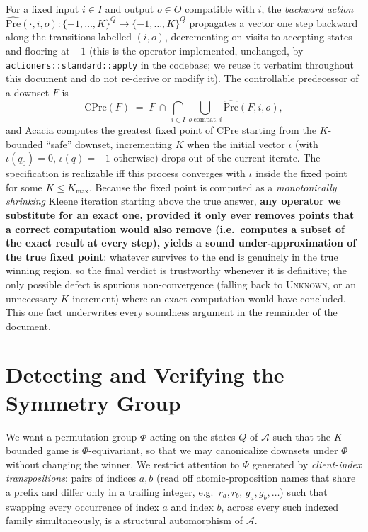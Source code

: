 \documentclass[11pt]{article}
\newcommand{\Aut}{\mathcal{A}}
\newcommand{\Q}{Q}
\newcommand{\Phigroup}{\Phi}
\newcommand{\CPre}{\mathrm{CPre}}
\newcommand{\PreHat}{\widehat{\mathrm{Pre}}}
\begin{document}
For a fixed input $i \in I$ and output $o \in O$ compatible with $i$, the
\emph{backward action} $\PreHat(\cdot, i, o) : \{-1,\dots,K\}^\Q \to
\{-1,\dots,K\}^\Q$ propagates a vector one step backward along the
transitions labelled $(i,o)$, decrementing on visits to accepting states and
flooring at $-1$ (this is the operator implemented, unchanged, by
\texttt{actioners::standard::apply} in the codebase; we reuse it verbatim
throughout this document and do not re-derive or modify it). The
controllable predecessor of a downset $F$ is
\[
  \CPre(F) \;=\; F \,\cap\, \bigcap_{i \in I} \bigcup_{o\ \mathrm{compat.}\ i} \PreHat(F, i, o),
\]
and Acacia computes the greatest fixed point of $\CPre$ starting from the
$K$-bounded ``safe'' downset, incrementing $K$ when the initial vector
$\iota$ (with $\iota(q_0)=0$, $\iota(q)=-1$ otherwise) drops out of the
current iterate. The specification is realizable iff this process converges
with $\iota$ inside the fixed point for some $K \leq K_{\max}$. Because the
fixed point is computed as a \emph{monotonically shrinking} Kleene
iteration starting above the true answer, \textbf{any operator we
substitute for an exact one, provided it only ever removes points that a
correct computation would also remove (i.e.\ computes a subset of the exact
result at every step), yields a sound under-approximation of the true
fixed point}: whatever survives to the end is genuinely in the true winning
region, so the final verdict is trustworthy whenever it is definitive; the
only possible defect is spurious non-convergence (falling back to
\textsc{Unknown}, or an unnecessary $K$-increment) where an exact
computation would have concluded. This one fact underwrites every
soundness argument in the remainder of the document.

\section{Detecting and Verifying the Symmetry Group}
\label{sec:detection}

We want a permutation group $\Phigroup$ acting on the states $\Q$ of $\Aut$
such that the $K$-bounded game is $\Phigroup$-equivariant, so that we may
canonicalize downsets under $\Phigroup$ without changing the winner. We
restrict attention to $\Phigroup$ generated by \emph{client-index
transpositions}: pairs of indices $a, b$ (read off atomic-proposition names
that share a prefix and differ only in a trailing integer, e.g.\ $r_a,
r_b$, $g_a, g_b, \dots$) such that swapping every occurrence of index $a$
and index $b$, across every such indexed family simultaneously, is a
structural automorphism of $\Aut$.
\end{document}
